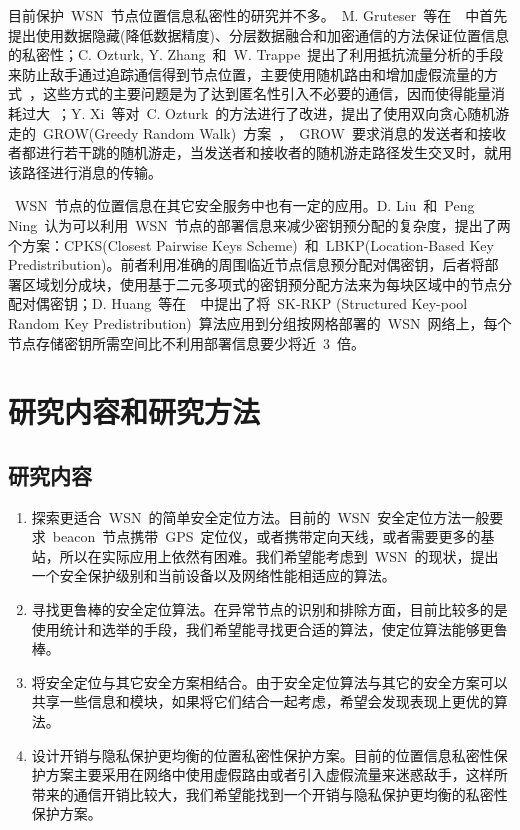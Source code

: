 \documentclass[a4paper,10pt]{article}
\begin{document}
目前保护~WSN~节点位置信息私密性的研究并不多。~M. Gruteser~等在~\cite{Gruteser2003}~中首先提出使用数据隐藏(降低数据精度)、分层数据融合和加密通信的方法保证位置信息的私密性；C. Ozturk, Y. Zhang~和~W. Trappe~提出了利用抵抗流量分析的手段来防止敌手通过追踪通信得到节点位置，主要使用随机路由和增加虚假流量的方式~\cite{Ozturk2004}，这些方式的主要问题是为了达到匿名性引入不必要的通信，因而使得能量消耗过大~\cite{Xiao2006}；Y. Xi~等对~C. Ozturk~的方法进行了改进，提出了使用双向贪心随机游走的~GROW(Greedy Random Walk)~方案~\cite{Xi2006}，~GROW~要求消息的发送者和接收者都进行若干跳的随机游走，当发送者和接收者的随机游走路径发生交叉时，就用该路径进行消息的传输。

~WSN~节点的位置信息在其它安全服务中也有一定的应用。D. Liu~和~Peng Ning~认为可以利用~WSN~节点的部署信息来减少密钥预分配的复杂度，提出了两个方案：CPKS(Closest Pairwise Keys Scheme)~和~LBKP(Location-Based Key Predistribution)\cite{Liu2003}。前者利用准确的周围临近节点信息预分配对偶密钥，后者将部署区域划分成块，使用基于二元多项式的密钥预分配方法来为每块区域中的节点分配对偶密钥；D. Huang~等在~\cite{Huang2004}~中提出了将~SK-RKP (Structured Key-pool Random Key Predistribution)~算法应用到分组按网格部署的~WSN~网络上，每个节点存储密钥所需空间比不利用部署信息要少将近~3~倍。

\section{研究内容和研究方法} 

\subsection{研究内容}

\begin{enumerate}

\item 探索更适合~WSN~的简单安全定位方法。目前的~WSN~安全定位方法一般要求~beacon~节点携带~GPS~定位仪，或者携带定向天线，或者需要更多的基站，所以在实际应用上依然有困难。我们希望能考虑到~WSN~的现状，提出一个安全保护级别和当前设备以及网络性能相适应的算法。

\item 寻找更鲁棒的安全定位算法。在异常节点的识别和排除方面，目前比较多的是使用统计和选举的手段，我们希望能寻找更合适的算法，使定位算法能够更鲁棒。

\item 将安全定位与其它安全方案相结合。由于安全定位算法与其它的安全方案可以共享一些信息和模块，如果将它们结合一起考虑，希望会发现表现上更优的算法。

\item 设计开销与隐私保护更均衡的位置私密性保护方案。目前的位置信息私密性保护方案主要采用在网络中使用虚假路由或者引入虚假流量来迷惑敌手，这样所带来的通信开销比较大，我们希望能找到一个开销与隐私保护更均衡的私密性保护方案。

\end{enumerate}
\end{document}
